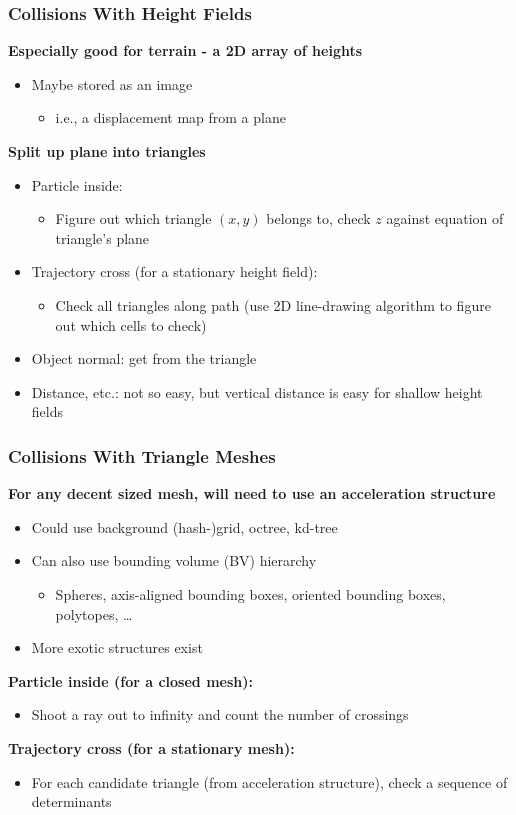 \documentclass{article}
\begin{document}
\subsubsection*{Collisions With Height Fields}
\textbf{Especially good for terrain - a 2D array of heights}
\begin{itemize}
    \item Maybe stored as an image
    \begin{itemize}
        \item i.e., a displacement map from a plane
    \end{itemize}
\end{itemize}
\textbf{Split up plane into triangles}
\begin{itemize}
    \item Particle inside:
    \begin{itemize}
        \item Figure out which triangle $(x, y)$ belongs to, check $z$ against equation of triangle's plane
    \end{itemize}
    \item Trajectory cross (for a stationary height field):
    \begin{itemize}
        \item Check all triangles along path (use 2D line-drawing algorithm to figure out which cells to check)
    \end{itemize}
    \item Object normal: get from the triangle
    \item Distance, etc.: not so easy, but vertical distance is easy for shallow height fields
\end{itemize}

\subsubsection*{Collisions With Triangle Meshes}
\textbf{For any decent sized mesh, will need to use an acceleration structure}
\begin{itemize}
    \item Could use background (hash-)grid, octree, kd-tree
    \item Can also use bounding volume (BV) hierarchy
    \begin{itemize}
        \item Spheres, axis-aligned bounding boxes, oriented bounding boxes, polytopes, \dots
    \end{itemize}
    \item More exotic structures exist
\end{itemize}
\textbf{Particle inside (for a closed mesh):}
\begin{itemize}
    \item Shoot a ray out to infinity and count the number of crossings
\end{itemize}
\textbf{Trajectory cross (for a stationary mesh):}
\begin{itemize}
    \item For each candidate triangle (from acceleration structure), check a sequence of determinants
\end{itemize}
\end{document}
